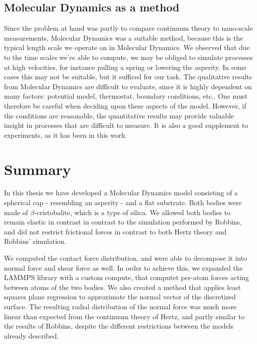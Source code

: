\documentclass[twoside,english]{uiofysmaster}
\begin{document}
\subsection{Molecular Dynamics as a method}
Since the problem at hand was partly to compare continuum theory to nano-scale measurements, Molecular Dynamics was a suitable method, because this is the typical length scale we operate on in Molecular Dynamics. 
We observed that due to the time scales we're able to compute, we may be obliged to simulate processes at high velocities, for instance pulling a spring or lowering the asperity. 
In some cases this may not be suitable, but it sufficed for our task.
The qualitative results from Molecular Dynamics are difficult to evaluate, since it is highly dependent on many factors: potential model, thermostat, boundary conditions, etc.. 
One must therefore be careful when deciding upon these aspects of the model. 
However, if the conditions are reasonable, the quantitative results may provide valuable insight in processes that are difficult to measure. 
It is also a good supplement to experiments, as it has been in this work.


\section{Summary}
In this thesis we have developed a Molecular Dynamics model consisting of a spherical cap - resembling an asperity - and a flat substrate. 
Both bodies were made of $\beta$-cristobalite, which is a type of silica. 
We allowed both bodies to remain elastic in contrast in contrast to the simulation performed by Robbins, and did not restrict frictional forces in contrast to both Hertz theory and Robbins' simulation.

We computed the contact force distribution, and were able to decompose it into normal force and shear force as well.
In order to achieve this, we expanded the LAMMPS library with a custom compute, that computet per-atom forces acting between atoms of the two bodies.
We also created a method that applies least squares plane regression to approximate the normal vector of the discretized surface. 
The resulting radial distribution of the normal force was much more linear than expected from the continuum theory of Hertz, and partly similar to the results of Robbins, despite the different restrictions between the models already described. 
\end{document}
